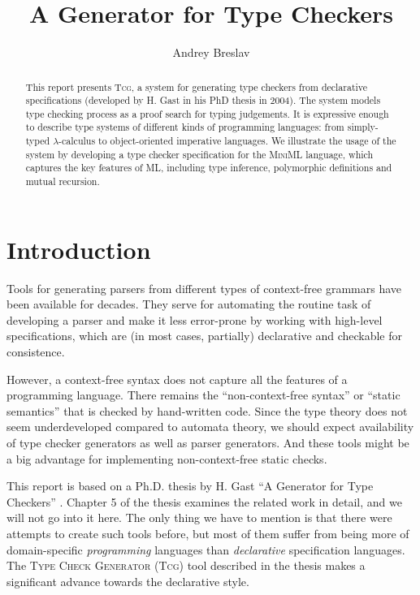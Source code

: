 \documentclass[a4paper,12pt]{article}
\title{A Generator for Type Checkers}
\author{Andrey Breslav}
\newcommand{\Tcg}{\textsc{Tcg}}
\begin{document}
\maketitle

\begin{abstract}
	This report presents \Tcg{}, a system for generating type checkers from declarative specifications (developed by H. Gast in his PhD thesis in 2004). The system models type checking process as a proof search for typing judgements. It is expressive enough to describe type systems of different kinds of programming languages: from simply-typed $\lambda$\mbox{-}calculus to object-oriented imperative languages. We illustrate the usage of the system by developing a type checker specification for the \textsc{MiniML} language, which captures the key features of ML, including type inference, polymorphic definitions and mutual recursion. 
\end{abstract}

\section{Introduction}

Tools for generating parsers from different types of context-free grammars have been available for decades. They serve for automating the routine task of developing a parser and make it less error-prone by working with high-level specifications, which are (in most cases, partially) declarative and checkable for consistence.

However, a context-free syntax does not capture all the features of a programming language. There remains the ``non-context-free syntax'' or ``static semantics'' that is checked by hand-written code. Since the type theory does not seem underdeveloped compared to automata theory, we should expect availability of type checker generators as well as parser generators. And these tools might be a big advantage for implementing non-context-free static checks.

This report is based on a Ph.D. thesis by H. Gast ``A Generator for Type Checkers'' \cite{Tcg}. Chapter 5 of the thesis examines the related work in detail, and we will not go into it here. The only thing we have to mention is that there were attempts to create such tools before, but most of them suffer from being more of domain-specific \emph{programming} languages than \emph{declarative} specification languages. The \textsc{Type Check Generator} (\Tcg{}) tool described in the thesis makes a significant advance towards the declarative style.
\end{document}
